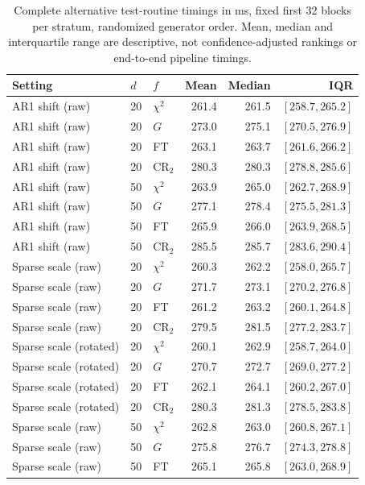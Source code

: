 \begin{table}[t]
\caption{Complete alternative test-routine timings in ms, fixed first 32 blocks per stratum, randomized generator order. Mean, median and interquartile range are descriptive, not confidence-adjusted rankings or end-to-end pipeline timings.}
\label{tab:matched-f-runtime-alternative}
\centering\small
\setlength{\tabcolsep}{8pt}\renewcommand{\arraystretch}{1.2}
\begin{tabular}{lllrrr}
\toprule
Setting & $d$ & $f$ & Mean & Median & IQR \\
\midrule
AR1 shift (raw) & 20 & $\chi^2$ & 261.4 & 261.5 & $[258.7, 265.2]$ \\
AR1 shift (raw) & 20 & $G$ & 273.0 & 275.1 & $[270.5, 276.9]$ \\
AR1 shift (raw) & 20 & FT & 263.1 & 263.7 & $[261.6, 266.2]$ \\
AR1 shift (raw) & 20 & CR$_2$ & 280.3 & 280.3 & $[278.8, 285.6]$ \\
AR1 shift (raw) & 50 & $\chi^2$ & 263.9 & 265.0 & $[262.7, 268.9]$ \\
AR1 shift (raw) & 50 & $G$ & 277.1 & 278.4 & $[275.5, 281.3]$ \\
AR1 shift (raw) & 50 & FT & 265.9 & 266.0 & $[263.9, 268.5]$ \\
AR1 shift (raw) & 50 & CR$_2$ & 285.5 & 285.7 & $[283.6, 290.4]$ \\
Sparse scale (raw) & 20 & $\chi^2$ & 260.3 & 262.2 & $[258.0, 265.7]$ \\
Sparse scale (raw) & 20 & $G$ & 271.7 & 273.1 & $[270.2, 276.8]$ \\
Sparse scale (raw) & 20 & FT & 261.2 & 263.2 & $[260.1, 264.8]$ \\
Sparse scale (raw) & 20 & CR$_2$ & 279.5 & 281.5 & $[277.2, 283.7]$ \\
Sparse scale (rotated) & 20 & $\chi^2$ & 260.1 & 262.9 & $[258.7, 264.0]$ \\
Sparse scale (rotated) & 20 & $G$ & 270.7 & 272.7 & $[269.0, 277.2]$ \\
Sparse scale (rotated) & 20 & FT & 262.1 & 264.1 & $[260.2, 267.0]$ \\
Sparse scale (rotated) & 20 & CR$_2$ & 280.3 & 281.3 & $[278.5, 283.8]$ \\
Sparse scale (raw) & 50 & $\chi^2$ & 262.8 & 263.0 & $[260.8, 267.1]$ \\
Sparse scale (raw) & 50 & $G$ & 275.8 & 276.7 & $[274.3, 278.8]$ \\
Sparse scale (raw) & 50 & FT & 265.1 & 265.8 & $[263.0, 268.9]$ \\

\end{tabular}
\end{table}

